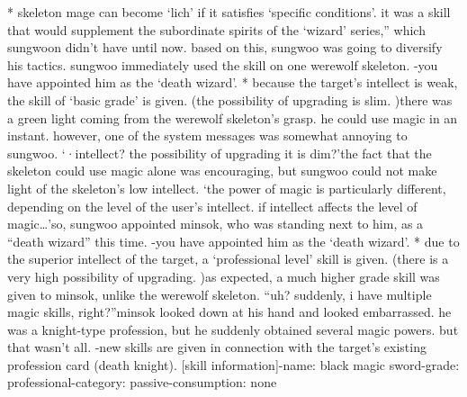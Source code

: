 * skeleton mage can become ‘lich’ if it satisfies ‘specific conditions’.
it was a skill that would supplement the subordinate spirits of the ‘wizard’ series,” which sungwoon didn’t have until now.
 based on this, sungwoo was going to diversify his tactics.
sungwoo immediately used the skill on one werewolf skeleton.
-you have appointed him as the ‘death wizard’.
* because the target’s intellect is weak, the skill of ‘basic grade’ is given.
 (the possibility of upgrading is slim.
)there was a green light coming from the werewolf skeleton’s grasp.
 he could use magic in an instant.
 however, one of the system messages was somewhat annoying to sungwoo.
‘·intellect? the possibility of upgrading it is dim?’the fact that the skeleton could use magic alone was encouraging, but sungwoo could not make light of the skeleton’s low intellect.
‘the power of magic is particularly different, depending on the level of the user’s intellect.
 if intellect affects the level of magic…’so, sungwoo appointed minsok, who was standing next to him, as a “death wizard” this time.
-you have appointed him as the ‘death wizard’.
* due to the superior intellect of the target, a ‘professional level’ skill is given.
 (there is a very high possibility of upgrading.
)as expected, a much higher grade skill was given to minsok, unlike the werewolf skeleton.
“uh? suddenly, i have multiple magic skills, right?”minsok looked down at his hand and looked embarrassed.
 he was a knight-type profession, but he suddenly obtained several magic powers.
but that wasn’t all.
-new skills are given in connection with the target’s existing profession card (death knight).
[skill information]-name: black magic sword-grade: professional-category: passive-consumption: none

